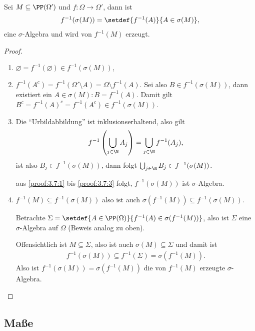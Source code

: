 \begin{prop}
\label{prop:3.7}
Sei $M\subseteq\PP(\Omega')$ und $f:\Omega\to\Omega'$, dann ist
\begin{align*}
f^{-1}(\sigma(M)) = \setdef{f^{-1}(A)}{A\in\sigma(M)},
\end{align*}
eine $\sigma$-Algebra und wird von $f^{-1}(M)$ erzeugt.\fishhere
\end{prop}
\begin{proof}
\begin{enumerate}[label=(\roman{*})]
  \item\label{proof:3.7:1} $\varnothing = f^{-1}(\varnothing) \in
  f^{-1}(\sigma(M))$,
  \item\label{proof:3.7:2} $f^{-1}(A^c) = f^{-1}(\Omega'\setminus A) = \Omega
  \setminus f^{-1}(A)$. Sei also $B\in f^{-1}(\sigma(M))$, dann existiert ein $A\in
  \sigma(M) : B = f^{-1}(A)$. Damit gilt $B^c = f^{-1}(A)^c =
  f^{-1}(A^c) \in f^{-1}(\sigma(M))$.
  \item\label{proof:3.7:3} Die ``Urbildabbildung'' ist inklusionserhaltend, also
  gilt
  \begin{align*}
  f^{-1}\left(\bigcup_{j\in\N} A_j\right)  = \bigcup_{j\in\N} f^{-1}(A_j),
  \end{align*}
  ist also $B_j\in f^{-1}(\sigma(M))$, dann folgt $\bigcup_{j\in\N} B_j \in
  f^{-1}(\sigma(M))$.
  \par
  aus \ref{proof:3.7:1} bis \ref{proof:3.7:3} folgt, $f^{-1}(\sigma(M))$ ist
$\sigma$-Algebra.
\item $f^{-1}(M) \subseteq f^{-1}(\sigma(M))$ also ist auch
$\sigma(f^{-1}(M))\subseteq f^{-1}(\sigma(M))$.

Betrachte $\Sigma = \setdef{A\in\PP(\Omega)}{f^{-1}(A)\in\sigma(f^{-1}(M))}$,
also ist $\Sigma$ eine $\sigma$-Algebra auf $\Omega$ (Beweis analog zu oben).
 
Offensichtlich ist $M\subseteq\Sigma$, also ist auch $\sigma(M)\subseteq
\Sigma$ und damit ist
\begin{align*}
f^{-1}(\sigma(M)) \subseteq f^{-1}(\Sigma) = \sigma(f^{-1}(M)).
\end{align*}
Also ist $f^{-1}(\sigma(M)) = \sigma(f^{-1}(M))$ die von $f^{-1}(M)$ erzeugte
$\sigma$-Algebra.\qedhere
\end{enumerate}
\end{proof}

\subsection{Maße}

